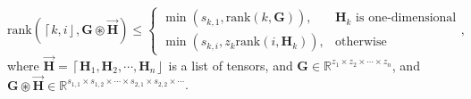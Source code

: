 \documentclass[twoside,11pt]{article}
\def\oconv{\circledast}
\def\rank{\text{rank}}
\def\tvar#1{\mathbf{#1}} %
\def\vsymb#1{\vec{\mathbf{#1}}}
\def\lcerfl#1{\left\lceil{#1}\right\rfloor}
\begin{document}
\begin{theorem}
  
  \begin{equation*}
    \rank(\lcerfl{k,i}, \tvar{G} \oconv \vsymb{H})
    \le \left\{\begin{array}{ll}
      \min\left(s_{k,1}, \rank(k, \tvar{G})\right),       & \tvar{H}_k \text{ is one-dimensional} \\
      \min\left(s_{k,i}, z_k \rank(i, \tvar{H}_k)\right), & \text{otherwise}
    \end{array}\right.,
  \end{equation*}
  where \(\vsymb{H} = \lcerfl{\tvar{H}_1, \tvar{H}_2, \cdots, \tvar{H}_n}\) is a list of tensors, and \(\tvar{G} \in \mathbb{R}^{z_1 \times z_2 \times \cdots \times z_n}\), and \(\tvar{G} \oconv \vsymb{H} \in \mathbb{R}^{s_{1,1} \times s_{1,2} \times \cdots \times s_{2,1} \times s_{2,2} \times \cdots}\).
  
  \label{thm:rank-oconv-g-hHH-is-mul-tucker-rank}
\end{theorem}
\end{document}
